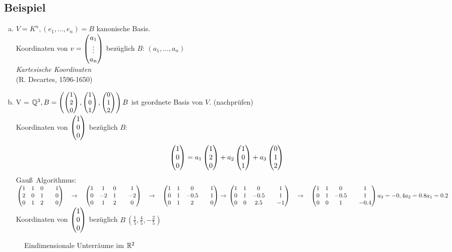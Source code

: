 \subsection{Beispiel}\label{sec:\thesubsection}
\begin{enumerate}[a)]
\item $V =K^n,(e_1,\ldots,e_n) = B$ kanonische Basis.\\
Koordinaten von $v = \begin{pmatrix} a_1\\\vdots\\a_n \end{pmatrix}$ bezüglich $B$: $(a_1,\ldots,a_n)$\\
\emph{Kartesische Koordinaten} \\ \phantom{ }\hfill (R. Decartes, 1596-1650)
\item V = $\mathbb{Q}^3, B = \left({\small \begin{pmatrix} 1\\2\\0 \end{pmatrix},\begin{pmatrix} 1\\0\\1 \end{pmatrix},\begin{pmatrix} 0\\1\\2 \end{pmatrix}}\right)\\
B$ ist geordnete Basis von $V$. (nachprüfen)\\
Koordinaten von $\begin{pmatrix} 1\\0\\0 \end{pmatrix}$ bezüglich $B$:
\[ \begin{pmatrix} 1\\0\\0 \end{pmatrix} = a_1\begin{pmatrix} 1\\2\\0 \end{pmatrix} + a_2\begin{pmatrix} 1\\0\\1 \end{pmatrix} + a_3\begin{pmatrix} 0\\1\\2 \end{pmatrix} \]
Gau\ss\ Algorithmus:\\
$\begin{pmatrix}
1&1&0&&1\\
2&0&1&&0\\
0&1&2&&0
\end{pmatrix}\quad\to\quad
\begin{pmatrix}
1&1&0&&1\\
0&-2&1&&-2\\
0&1&2&&0
\end{pmatrix}\quad\to\quad
\begin{pmatrix}
1&1&0&&1\\
0&1&-0.5&&1\\
0&1&2&&0
\end{pmatrix}\to\\
\begin{pmatrix}
1&1&0&&1\\
0&1&-0.5&&1\\
0&0&2.5&&-1
\end{pmatrix}\quad\to\quad
\begin{pmatrix}
1&1&0&&1\\
0&1&-0.5&&1\\
0&0&1&&-0.4
\end{pmatrix}\\
a_3 = -0,4\\
a_2 = 0.8\\
a_1 = 0.2$\\
Koordinaten von $\begin{pmatrix} 1\\0\\0 \end{pmatrix}$ bezüglich $B\ \left(\frac15,\frac45,-\frac25\right)$
\end{enumerate}
\begin{figure}[h!]
\centering
\caption{Eindimensionale Unterräume im $\mathbb{R}^2$}
\end{figure}
